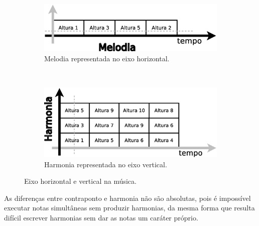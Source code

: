 \begin{figure}
    \centering
    \begin{subfigure}[b]{0.70\textwidth}
        \includegraphics[width=\textwidth]{chapters/cap-musica-basica/melodia}
        \caption{Melodia representada no eixo horizontal.}
        \label{fig:melodia}
    \end{subfigure}
    ~ %
    \begin{subfigure}[b]{0.70\textwidth}
        \includegraphics[width=\textwidth]{chapters/cap-musica-basica/harmonia}
        \caption{Harmonia representada no eixo vertical.}
        \label{fig:harmonia}
    \end{subfigure}
    \caption{Eixo horizontal e vertical na música.}\label{fig:meloharmo}
\end{figure}

\begin{tcbattention}
As diferenças entre contraponto e harmonia não são absolutas,
pois é impossível executar notas simultâneas sem produzir harmonias,
da mesma forma que resulta difícil escrever harmonias sem dar as notas um caráter próprio.
\end{tcbattention}

